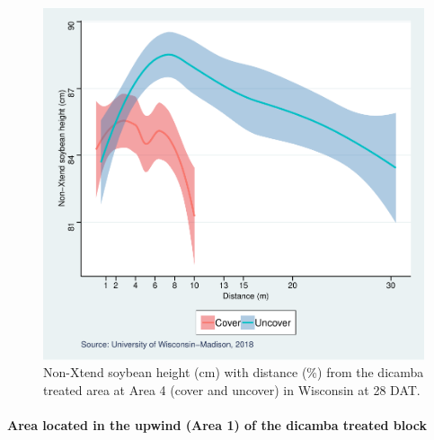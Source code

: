 \documentclass[]{article}
\let\oldparagraph\paragraph
\renewcommand{\paragraph}[1]{\oldparagraph{#1}\mbox{}}
\begin{document}
\begin{figure}
\centering
\includegraphics{Report_files/figure-latex/unnamed-chunk-111-1.pdf}
\caption{Non-Xtend soybean height (cm) with distance (\%) from the
dicamba treated area at Area 4 (cover and uncover) in Wisconsin at 28
DAT.}
\end{figure}

\pagebreak
\newpage

\paragraph{Area located in the upwind (Area 1) of the dicamba treated
block}\label{area-located-in-the-upwind-area-1-of-the-dicamba-treated-block-1}
\end{document}
